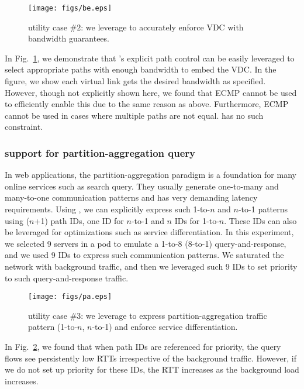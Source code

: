 \begin{figure}[t]
\centering
\texttt{[image: figs/be.eps]}
\caption{\sys utility case $\#2$: we leverage \sys to accurately enforce VDC with bandwidth guarantees.}
\label{fig:bandwidth_enforcement}
\end{figure}


In Fig.~\ref{fig:bandwidth_enforcement}, we demonstrate that \sys's explicit path control can be easily leveraged to select appropriate paths with enough bandwidth to embed the VDC. In the figure, we show each virtual link gets the desired bandwidth as specified. However, though not explicitly shown here, we found that ECMP cannot be used to efficiently enable this due to the same reason as above. Furthermore, ECMP cannot be used in cases where multiple paths are not equal. \sys has no such constraint.

\subsubsection{\sys support for partition-aggregation query}
In web applications, the partition-aggregation paradigm is a foundation for many online services such as search query. They usually generate one-to-many and many-to-one communication patterns and has very demanding latency requirements. Using \sys, we can explicitly express such 1-to-$n$ and $n$-to-1 patterns using ($n$+1) path IDs, one ID for $n$-to-1 and $n$ IDs for 1-to-$n$. These IDs can also be leveraged for optimizations such as service differentiation. In this experiment, we selected 9 servers in a pod to emulate a 1-to-8 (8-to-1) query-and-response, and we used 9 IDs to express such communication patterns. We saturated the network with background traffic, and then we leveraged such 9 IDs to set priority to such query-and-response traffic.

\begin{figure}[t]
\centering
\texttt{[image: figs/pa.eps]}
\caption{\sys utility case $\#3$: we leverage \sys to express partition-aggregation traffic pattern (1-to-$n$, $n$-to-1) and enforce service differentiation.}
\label{fig:partition_aggregation_query}
\end{figure}

In Fig.~\ref{fig:partition_aggregation_query}, we found that when path IDs are referenced for priority, the query flows see persistently low RTTs irrespective of the background traffic. However, if we do not set up priority for these IDs, the RTT increases as the background load increases.

